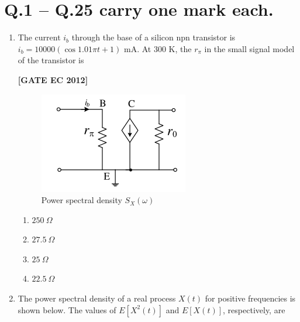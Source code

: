 \documentclass[12pt]{article}
\begin{document}
\section*{Q.1 -- Q.25 carry one mark each.}
\begin{enumerate}[leftmargin=1.0em, label=\textbf{Q.\arabic*.}, itemsep=2em]

\item The current $i_b$ through the base of a silicon npn transistor is $i_b = 10000(\cos 1.01 \pi t + 1)$ mA. At 300 K, the $r_\pi$ in the small signal model of the transistor is

\noindent \textbf{[GATE EC 2012]}
\begin{figure}[H]\centering
\includegraphics[width=0.5\columnwidth]{figs/q1.png}
\caption{Power spectral density $S_X(\omega)$}
\label{fig:q1}
\end{figure}
\begin{multicols}{2}
    \begin{enumerate}
        \item $250~\Omega$
        \item $27.5~\Omega$
        \item $25~\Omega$
        \item $22.5~\Omega$
    \end{enumerate}
\end{multicols}

\item The power spectral density of a real process $X(t)$ for positive frequencies is shown below. The values of $E[X^2(t)]$ and $E[X(t)]$, respectively, are


\end{enumerate}
\end{document}
